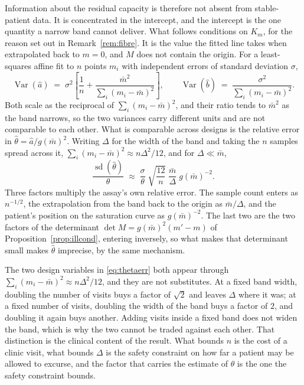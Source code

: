 Information about the residual capacity is therefore not absent from stable-patient data.
It is concentrated in the intercept, and the intercept is the one quantity a narrow band
cannot deliver. What follows conditions on $K_m$, for the reason set out in
Remark~\ref{rem:fibre}. It is the value the fitted line takes when extrapolated back to $m = 0$, and
$M$ does not contain the origin. For a least-squares affine fit to $n$ points $m_i$ with
independent errors of standard deviation $\sigma$,
\begin{equation}
\operatorname{Var}(\hat a) \;=\; \sigma^2\!\left[\frac{1}{n} +
\frac{\bar m^2}{\sum_i (m_i - \bar m)^2}\right] ,
\qquad
\operatorname{Var}(\hat b) \;=\; \frac{\sigma^2}{\sum_i (m_i - \bar m)^2} .
\label{eq:varfit}
\end{equation}
Both scale as the reciprocal of $\sum_i (m_i - \bar m)^2$, and their ratio tends to
$\bar m^2$ as the band narrows, so the two variances carry different units and are not
comparable to each other. What is comparable across designs is the relative error in
$\hat\theta = \hat a / g(\bar m)^2$. Writing $\Delta$ for the width of the band and taking
the $n$ samples spread across it, $\sum_i (m_i - \bar m)^2 \approx n\Delta^2/12$, and for
$\Delta \ll \bar m$,
\begin{equation}
\frac{\operatorname{sd}(\hat\theta)}{\theta} \;\approx\;
\frac{\sigma}{\theta}\;\sqrt{\frac{12}{n}}\;\frac{\bar m}{\Delta}\;g(\bar m)^{-2} .
\label{eq:thetaerr}
\end{equation}
Three factors multiply the assay's own relative error. The sample count enters as
$n^{-1/2}$, the extrapolation from the band back to the origin as $\bar m/\Delta$, and the
patient's position on the saturation curve as $g(\bar m)^{-2}$. The last two are the two
factors of the determinant $\det M = g(\bar m)^2 (m' - m)$ of
Proposition~\ref{prop:illcond}, entering inversely, so what makes that determinant small
makes $\hat\theta$ imprecise, by the same mechanism.

The two design variables in \eqref{eq:thetaerr} both appear through
$\sum_i (m_i - \bar m)^2 \approx n\Delta^2/12$, and they are not substitutes. At a fixed
band width, doubling the number of visits buys a factor of $\sqrt2$ and leaves $\Delta$
where it was; at a fixed number of visits, doubling the width of the band buys a factor of
$2$, and doubling it again buys another. Adding visits inside a fixed band does not widen
the band, which is why the two cannot be traded against each other. That distinction is the
clinical content of the result. What bounds $n$ is the cost of a clinic visit, what bounds
$\Delta$ is the safety constraint on how far a patient may be allowed to excurse, and the
factor that carries the estimate of $\theta$ is the one the safety constraint bounds.

